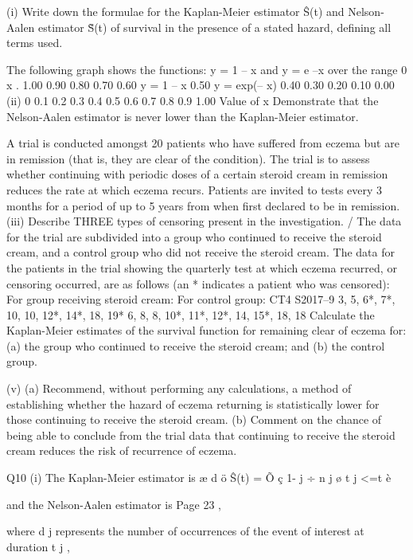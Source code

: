 \documentclass[a4paper,12pt]{article}
\begin{document}
(i)
Write down the formulae for the Kaplan-Meier estimator Ŝ(t) and Nelson-Aalen estimator S̃(t) of survival in the presence of a stated hazard,
defining all terms used.

The following graph shows the functions:
y = 1 – x and
y = e –x over the range 0 \leq x .
1.00
0.90
0.80
0.70
0.60
y = 1 – x
0.50
y = exp(– x)
0.40
0.30
0.20
0.10
0.00
(ii)
0
0.1 0.2 0.3 0.4 0.5 0.6 0.7 0.8 0.9 1.00
Value of x
Demonstrate that the Nelson-Aalen estimator is never lower than the
Kaplan-Meier estimator.

A trial is conducted amongst 20 patients who have suffered from eczema but are
in remission (that is, they are clear of the condition). The trial is to assess whether
continuing with periodic doses of a certain steroid cream in remission reduces the rate
at which eczema recurs. Patients are invited to tests every 3 months for a period of up
to 5 years from when first declared to be in remission.
(iii)
Describe THREE types of censoring present in the investigation.
/
The data for the trial are subdivided into a group who continued to receive the steroid
cream, and a control group who did not receive the steroid cream. The data for the
patients in the trial showing the quarterly test at which eczema recurred, or censoring
occurred, are as follows (an * indicates a patient who was censored):
For group receiving steroid cream:
For control group:
CT4 S2017–9 
3, 5, 6*, 7*, 10, 10, 12*, 14*, 18, 19*
6, 8, 8, 10*, 11*, 12*, 14, 15*, 18, 18
Calculate the Kaplan-Meier estimates of the survival function for remaining
clear of eczema for:
(a)
the group who continued to receive the steroid cream; and
(b)
the control group.

(v)
(a)
Recommend, without performing any calculations, a method of
establishing whether the hazard of eczema returning is statistically
lower for those continuing to receive the steroid cream.
(b)
Comment on the chance of being able to conclude from the trial
data that continuing to receive the steroid cream reduces the risk of
recurrence of eczema.



Q10
(i)
The Kaplan-Meier estimator is
æ d ö
Ŝ(t) = Õ ç 1- j ÷
n j ø
t j <=t è

and the Nelson-Aalen estimator is
Page 23%
,

where d j represents the number of occurrences of the event of
interest at duration t j ,
\end{document}
